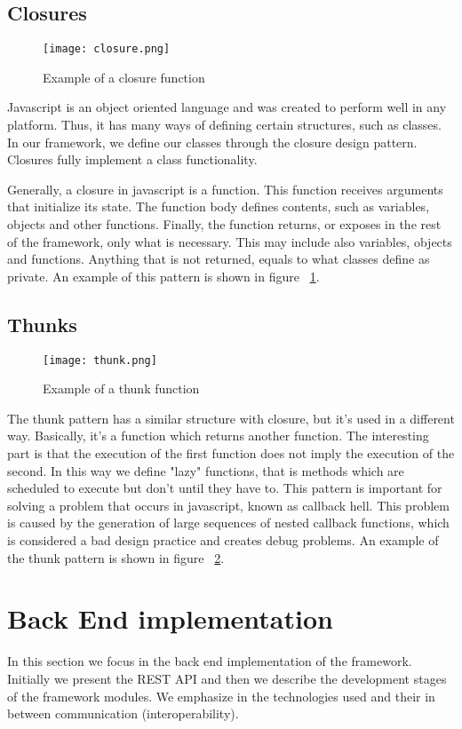 \subsection{Closures}
\begin{figure}
	\centerline{\texttt{[image: closure.png]}}
	\caption{Example of a closure function}
	\label{closure}
\end{figure} 
Javascript is an object oriented language and was created to perform well in any platform. Thus, it has many ways of defining certain structures, such as classes. In our framework, we define our classes through the closure design pattern. Closures fully implement a class functionality.\par
	Generally, a closure in javascript is a function. This function receives arguments that initialize its state. The function body defines contents, such as variables, objects and other functions. Finally, the function returns, or exposes in the rest of the framework, only what is necessary. This may include also variables, objects and functions. Anything that is not returned, equals to what classes define as private. An example of this pattern is shown in figure ~\ref{closure}.

\subsection{Thunks}
\begin{figure}
	\centerline{\texttt{[image: thunk.png]}}
	\caption{Example of a thunk function}
	\label{thunk}
\end{figure} 
The thunk pattern has a similar structure with closure, but it's used in a different way. Basically, it's a function which returns another function. The interesting part is that the execution of the first function does not imply the execution of the second. In this way we define "lazy" functions, that is methods which are scheduled to execute but don't until they have to. This pattern is important for solving a problem that occurs in javascript, known as callback hell. This problem is caused by the generation of large sequences of nested callback functions, which is considered a bad design practice and creates debug problems. An example of the thunk pattern is shown in figure ~\ref{thunk}.

\section{Back End implementation}
In this section we focus in the back end implementation of the framework. Initially we present the REST API and then we describe the development stages of the framework modules. We emphasize in the technologies used and their in between communication (interoperability).

